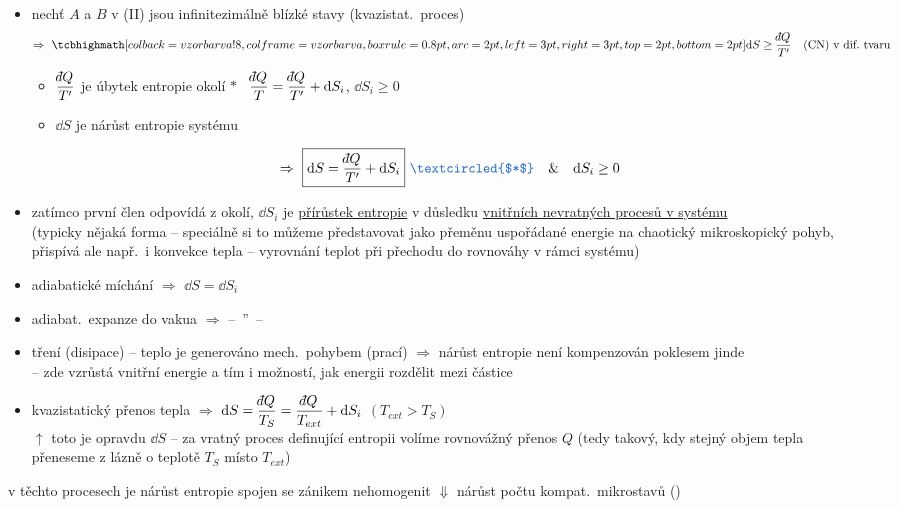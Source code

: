 \begin{itemize}
  \item nechť $A$ a $B$ v (II) jsou infinitezimálně blízké stavy (kvazistat.\ proces)
  \[
    \Rightarrow\ \vzorec{\dd S \geq \frac{\dbar Q}{T'}} \quad \text{(CN) v dif.\ tvaru}
  \]
  \begin{itemize}[nosep]
    \item $\dfrac{\dbar Q}{T'}$ je úbytek entropie okolí \hfill
          {\color{NavyBlue}\textcircled{$*$} \ $\dfrac{\dbar Q}{T} = \dfrac{\dbar Q}{T'} + \dd S_i$, \quad $\dd S_i \geq 0$}
    \item $\dd S$ je nárůst entropie systému
  \end{itemize}
  \[
    \Rightarrow\ \boxed{\dd S = \frac{\dbar Q}{T'} + \dd S_i}\ {\color{NavyBlue}\textcircled{$*$}} \quad \& \quad \dd S_i \geq 0
  \]
  \item zatímco první člen odpovídá  z okolí, $\dd S_i$ je \underline{přírůstek entropie} v důsledku \underline{vnitřních nevratných procesů v systému} \\
  {\color{NavyBlue}\small (typicky nějaká forma  -- speciálně si to můžeme představovat jako přeměnu uspořádané energie na chaotický mikroskopický pohyb, přispívá ale např.\ i konvekce tepla -- vyrovnání teplot při přechodu do rovnováhy v rámci systému)}
\end{itemize}

\begin{priklad}[Př:]
\begin{itemize}[nosep]
  \item adiabatické míchání $\Rightarrow$ $\dd S = \dd S_i$
  \item adiabat.\ expanze do vakua $\Rightarrow$ \quad -- \,''\, --
  \item tření (disipace) -- teplo je generováno mech.\ pohybem (prací) $\Rightarrow$ nárůst entropie není kompenzován poklesem jinde \\
        {\color{NavyBlue}\small -- zde vzrůstá vnitřní energie a tím i  možností, jak energii rozdělit mezi částice}
  \item kvazistatický přenos tepla $\Rightarrow$ $\dd S = \dfrac{\dbar Q}{T_S} = \dfrac{\dbar Q}{T_{ext}} + \dd S_i$ \quad $(T_{ext} > T_S)$ \\
        {\color{NavyBlue}\small $\uparrow$ toto je opravdu $\dd S$ -- za vratný proces definující entropii volíme rovnovážný přenos $Q$ (tedy takový, kdy stejný objem tepla přeneseme z lázně o teplotě $T_S$ místo $T_{ext}$)}
\end{itemize}
{\color{NavyBlue}\small v těchto procesech je nárůst entropie spojen se zánikem nehomogenit $\Downarrow$ nárůst počtu kompat.\ mikrostavů ()}
\end{priklad}

